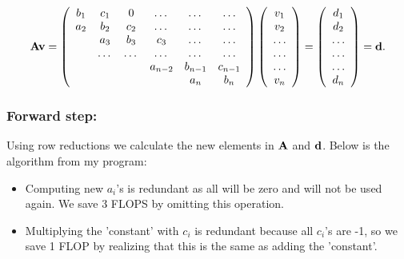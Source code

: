 \documentclass[norsk,a4paper,12pt]{article}
\begin{document}
\begin{equation}
    {\bf Av} = \left(\begin{array}{cccccc}
                           b_1& c_1 & 0 &\dots   & \dots &\dots \\
                           a_2 & b_2 & c_2 &\dots &\dots &\dots \\
                           & a_3 & b_3 & c_3 & \dots & \dots \\
                           & \dots   & \dots &\dots   &\dots & \dots \\
                           &   &  &a_{n-2}  &b_{n-1}& c_{n-1} \\
                           &    &  &   &a_n & b_n \\
                      \end{array} \right)\left(\begin{array}{c}
                           v_1\\
                           v_2\\
                           \dots \\
                          \dots  \\
                          \dots \\
                           v_n\\
                      \end{array} \right)
  =\left(\begin{array}{c}
                           d_1\\
                           d_2\\
                           \dots \\
                           \dots \\
                           \dots \\
                           d_n\\
                      \end{array} \right) = {\bf d}.
\end{equation}


\subsubsection*{Forward step:}
Using row reductions we calculate the new elements in $\bf A$ and $\bf d$.
Below is the algorithm from my program:


\begin{itemize}
\item Computing new $a_i$'s is redundant as all will be zero and will not be used again. We save 3 FLOPS by omitting this operation.
\item Multiplying the 'constant' with $c_i$ is redundant because all $c_i$'s are -1, so we save 1 FLOP by realizing that this is the same as adding the 'constant'.
\end{itemize}
\end{document}
